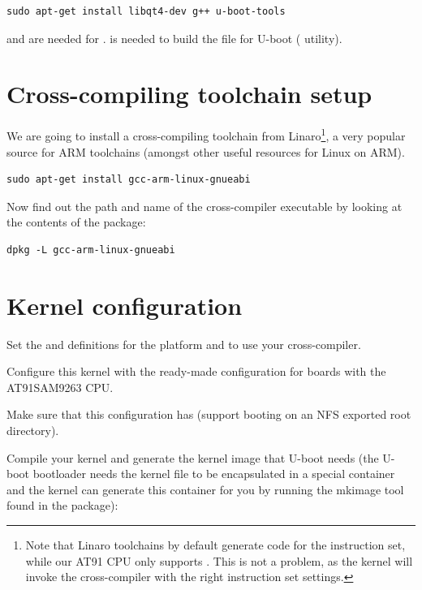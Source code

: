 \begin{verbatim}
sudo apt-get install libqt4-dev g++ u-boot-tools
\end{verbatim}

 and  are needed for .
 is needed to build the  file for
U-boot ( utility).

\section{Cross-compiling toolchain setup}

We are going to install a cross-compiling toolchain from
Linaro\footnote{Note that Linaro toolchains by default generate code
for the  instruction set, while our AT91 CPU only supports
. This is not a problem, as the kernel  will
invoke the cross-compiler with the right instruction set settings.}, a
very popular source for ARM toolchains (amongst other useful resources
for Linux on ARM).

\begin{verbatim}
sudo apt-get install gcc-arm-linux-gnueabi
\end{verbatim}

Now find out the path and name of the cross-compiler executable by looking at the contents of the package:

\begin{verbatim}
dpkg -L gcc-arm-linux-gnueabi
\end{verbatim}

\section{Kernel configuration}

Set the  and  definitions for the 
platform and to use your cross-compiler.

Configure this kernel with the ready-made configuration for boards
with the AT91SAM9263 CPU.

Make sure that this configuration has  (support
booting on an NFS exported root directory).

Compile your kernel and generate the  kernel image that U-boot
needs (the U-boot bootloader needs the kernel  file to be
encapsulated in a special container and the kernel  can
generate this container for you by running the mkimage tool found in
the  package):

